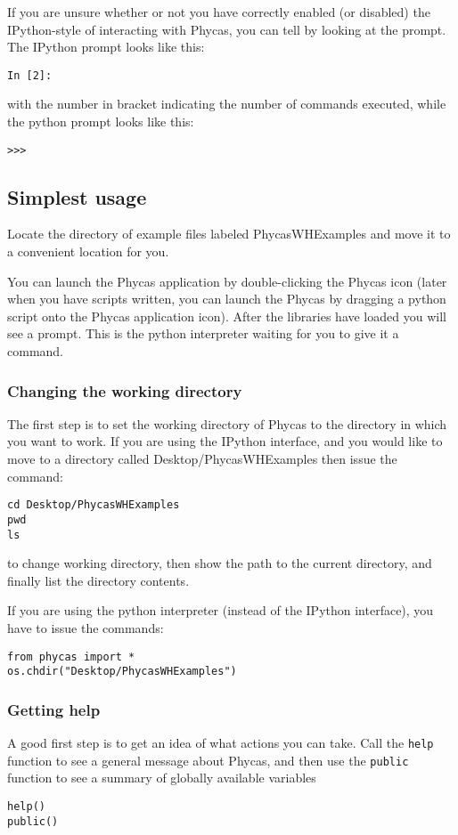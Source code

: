 \documentclass{article}
\newcommand{\cmd}[1]{\texttt{#1}\xspace}
\newcommand{\phycas}{Phycas\xspace}
\newcommand{\localfile}[1]{\textsf{#1}\xspace}
\begin{document}
If you are unsure whether or not you have correctly enabled (or disabled) the IPython-style of interacting with \phycas, you can tell by looking at the prompt.
The IPython prompt looks like this:
\begin{verbatim}
In [2]: 
\end{verbatim}
with the number in bracket indicating the number of commands executed, while the python prompt looks like this:
\begin{verbatim}
>>>
\end{verbatim}


\subsection{Simplest usage}
Locate the directory of example files labeled \localfile{PhycasWHExamples} and move it to a convenient location for you.

You can launch the \phycas application by double-clicking the \phycas icon  (later when you have scripts written, you can launch the \phycas by dragging a python script onto the \phycas application icon).
After the libraries have loaded you will see a prompt.
This is the python interpreter waiting for you to give it a command.

\subsubsection{Changing the working directory}
The first step is to set the working directory of \phycas to the directory in which you want to work.
If you are using the IPython interface, and you would like to  move to a directory called \localfile{Desktop/PhycasWHExamples} then issue the command:
\begin{verbatim}
cd Desktop/PhycasWHExamples
pwd
ls
\end{verbatim}
to change working directory, then show the path to the current directory, and finally list the directory contents.

If you are using the  python interpreter (instead of the IPython interface), you have to issue the commands:
\begin{verbatim}
from phycas import *
os.chdir("Desktop/PhycasWHExamples")
\end{verbatim}

\subsubsection{Getting help}
A good first step is to get an idea of what actions you can take. 
Call the \cmd{help} function to see a general message about \phycas, and then
use the \cmd{public} function to see a summary of globally available
variables
\begin{verbatim}
help()
public()
\end{verbatim}
\end{document}
